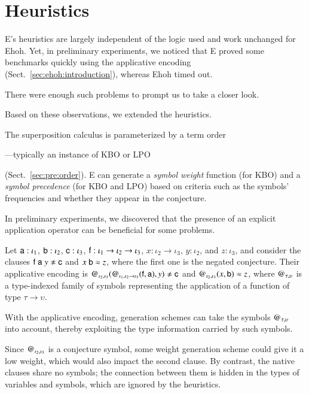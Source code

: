 \section{Heuristics}
\label{sec:ehoh:heuristics}

E's heuristics are largely independent of the logic used and work
unchanged for Ehoh. Yet, in preliminary experiments, we noticed that E proved
some \lfhol{} benchmarks quickly using the applicative encoding
(Sect.~\ref{sec:ehoh:introduction}), whereas Ehoh timed out.
\begin{rep}There were enough such problems to prompt us to take a
closer look. \end{rep}%
Based on these observations, we extended the heuristics.

The superposition calculus is parameterized by a term
order\begin{rep}---typically an instance of KBO or LPO\end{rep} (Sect.~\ref{sec:pre:order}).
E can generate a \emph{symbol weight} function (for KBO) and a \emph{symbol
precedence} (for KBO and LPO) based on criteria such as the symbols'
frequencies and whether they appear in the conjecture.

In preliminary experiments, we discovered that the presence of an explicit
application operator \appvar{} can be beneficial for some problems.
\begin{rep}
Let $\mathsf{a} : \iota_1$,
$\mathsf{b} : \iota_2$, $\mathsf{c} : \iota_3$, $\mathsf{f} : \iota_1 \to \iota_2 \to
\iota_3$, $x : \iota_2 \to \iota_3$, $y : \iota_2$, and $z : \iota_3$, and
consider the clauses
%
$\cst{f} \; \cst{a} \; y \noteq \cst{c}$ and
$x \; \mathsf{b} \approx z$,
%
where the first one is the negated conjecture. Their applicative encoding
is
%
$\cst{@}_{\iota_2,\iota_3}(\cst{@}_{\iota_1,\iota_2\to\iota_3}(\cst{f}, \cst{a}), y) \noteq \cst{c}$ and
$\mathsf{@}_{\iota_2,\iota_3}(x, \mathsf{b}) \approx z$,
%
where $\mathsf{@}_{\tau,\upsilon}$ is a type-indexed family of
symbols representing the application of a function of type $\tau
\to \upsilon$.
\end{rep}%
With the applicative encoding, generation schemes can take the symbols
$\mathsf{@}_{\tau,\upsilon}$ into account, thereby exploiting the type
information carried by such symbols.\begin{rep} Since $\mathsf{@}_{\iota_2,\iota_3}$ is a
conjecture symbol, some weight generation scheme could give it a low weight,
which would also impact the second clause. By contrast, the native \lfhol{}
clauses share no symbols; the connection between them is hidden in the types
of variables and symbols, which are ignored by the heuristics.

\end{rep}

